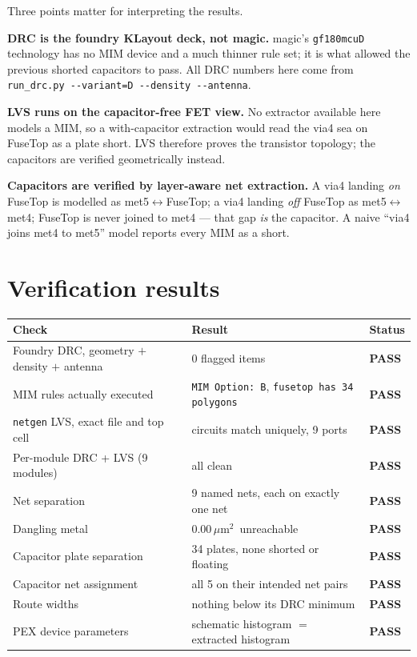 \documentclass[11pt,a4paper]{article}
\newcommand{\PASS}{\textcolor{green!50!black}{\textbf{PASS}}}
\newcommand{\umsq}{\,$\mu$m$^2$}
\begin{document}
Three points matter for interpreting the results.

\textbf{DRC is the foundry KLayout deck, not magic.} magic's \texttt{gf180mcuD} technology has
no MIM device and a much thinner rule set; it is what allowed the previous shorted capacitors
to pass. All DRC numbers here come from
\texttt{run\_drc.py -{-}variant=D -{-}density -{-}antenna}.

\textbf{LVS runs on the capacitor-free FET view.} No extractor available here models a MIM, so
a with-capacitor extraction would read the via4 sea on FuseTop as a plate short. LVS therefore
proves the transistor topology; the capacitors are verified geometrically instead.

\textbf{Capacitors are verified by layer-aware net extraction.} A via4 landing \emph{on}
FuseTop is modelled as met5$\leftrightarrow$FuseTop; a via4 landing \emph{off} FuseTop as
met5$\leftrightarrow$met4; FuseTop is never joined to met4 --- that gap \emph{is} the
capacitor. A naive ``via4 joins met4 to met5'' model reports every MIM as a short.

\section{Verification results}

\begin{longtable}{@{}lll@{}}
\toprule
\textbf{Check} & \textbf{Result} & \textbf{Status} \\
\midrule
\endhead
Foundry DRC, geometry $+$ density $+$ antenna & 0 flagged items & \PASS \\
\quad MIM rules actually executed & \texttt{MIM Option: B}, \texttt{fusetop has 34 polygons} & \PASS \\
\texttt{netgen} LVS, exact file and top cell & circuits match uniquely, 9 ports & \PASS \\
Per-module DRC + LVS (9 modules) & all clean & \PASS \\
Net separation & 9 named nets, each on exactly one net & \PASS \\
Dangling metal & 0.00\umsq\ unreachable & \PASS \\
Capacitor plate separation & 34 plates, none shorted or floating & \PASS \\
Capacitor net assignment & all 5 on their intended net pairs & \PASS \\
Route widths & nothing below its DRC minimum & \PASS \\
PEX device parameters & schematic histogram $=$ extracted histogram & \PASS \\
\bottomrule
\end{longtable}
\end{document}
